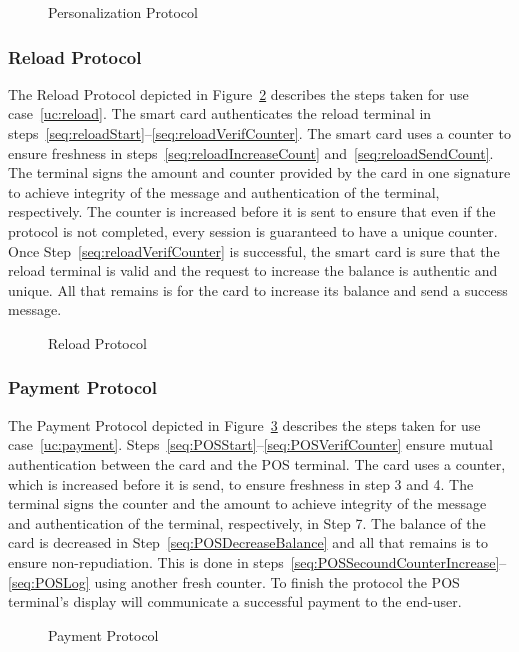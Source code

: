  \begin{figure}[h!]
     \centering
     
     \caption{Personalization Protocol}
     \label{fig:PersonProtocol}
 \end{figure}

\subsubsection{Reload Protocol}
The Reload Protocol depicted in Figure~\ref{fig:ReloadProtocol} describes the steps taken for use case~\ref{uc:reload}.
The smart card authenticates the reload terminal in steps~\ref{seq:reloadStart}--\ref{seq:reloadVerifCounter}.
The smart card uses a counter to ensure freshness in steps~\ref{seq:reloadIncreaseCount} and~\ref{seq:reloadSendCount}.
The terminal signs the amount and counter provided by the card in one signature to achieve integrity of the message and authentication of the terminal, respectively.
The counter is increased before it is sent to ensure that even if the protocol is not completed, every session is guaranteed to have a unique counter.
Once Step~\ref{seq:reloadVerifCounter} is successful, the smart card is sure that the reload terminal is valid and the request to increase the balance is authentic and unique.
All that remains is for the card to increase its balance and send a success message.
 \begin{figure}[h!]
     \centering
     
     \caption{Reload Protocol}
     \label{fig:ReloadProtocol}
 \end{figure}

\subsubsection{Payment Protocol}
The Payment Protocol depicted in Figure~\ref{fig:POSProtocol} describes the steps taken for use case~\ref{uc:payment}.
Steps~\ref{seq:POSStart}--\ref{seq:POSVerifCounter} ensure mutual authentication between the card and the POS terminal.
The card uses a counter, which is increased before it is send, to ensure freshness in step 3 and 4.
The terminal signs the counter and the amount to achieve integrity of the message and authentication of the terminal, respectively, in Step 7.
The balance of the card is decreased in Step~\ref{seq:POSDecreaseBalance} and all that remains is to ensure non-repudiation.
This is done in steps~\ref{seq:POSSecoundCounterIncrease}--\ref{seq:POSLog} using another fresh counter.
To finish the protocol the POS terminal's display will communicate a successful payment to the end-user.
\begin{figure}[h!]
    \centering
    
    \caption{Payment Protocol}
    \label{fig:POSProtocol}
\end{figure}



